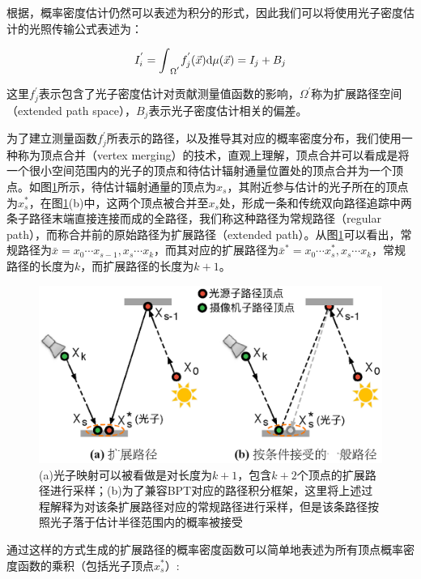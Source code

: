 根据\cite{a:Densityestimationforstatisticsanddataanalysis}，概率密度估计仍然可以表述为积分的形式，因此我们可以将使用光子密度估计的光照传输公式表述为：

\begin{equation}
	I^{'}_i={\rm \int}_{\Omega^{'}}f^{'}_j(\vec{x}){\rm d}\mu(\vec{x})=I_j+B_j
\end{equation}

\noindent 这里$f^{'}_j$表示包含了光子密度估计对贡献测量值函数的影响，$\Omega^{'}$称为扩展路径空间（extended path space），$B_j$表示光子密度估计相关的偏差。

为了建立测量函数$f^{'}_j$所表示的路径，以及推导其对应的概率密度分布，我们使用一种称为顶点合并（vertex merging）的技术，直观上理解，顶点合并可以看成是将一个很小空间范围内的光子的顶点和待估计辐射通量位置处的顶点合并为一个顶点。如图\ref{f:pm-vcm}所示，待估计辐射通量的顶点为$x_s$，其附近参与估计的光子所在的顶点为$x^{*}_{s}$，在图\ref{f:pm-vcm}(b)中，这两个顶点被合并至$x_s$处，形成一条和传统双向路径追踪中两条子路径末端直接连接而成的全路径，我们称这种路径为常规路径（regular path），而称合并前的原始路径为扩展路径（extended path）。从图\ref{f:pm-vcm}可以看出，常规路径为$\bar{x}=x_0\cdots x_{s-1},x_s\cdots x_k$，而其对应的扩展路径为$\bar{x}^{*}=x_0\cdots x^{*}_{s},x_s\cdots x_k$，常规路径的长度为$k$，而扩展路径的长度为$k+1$。

\begin{figure}
\sidecaption
	\includegraphics[width=.65\textwidth]{figures/pm/vcm}
	\caption{(a)光子映射可以被看做是对长度为$k+1$，包含$k+2$个顶点的扩展路径进行采样；(b)为了兼容BPT对应的路径积分框架，这里将上述过程解释为对该条扩展路径对应的常规路径进行采样，但是该条路径按照光子落于估计半径范围内的概率被接受}
	\label{f:pm-vcm}
\end{figure}

通过这样的方式生成的扩展路径的概率密度函数可以简单地表述为所有顶点概率密度函数的乘积（包括光子顶点$x^{*}_s$）:

